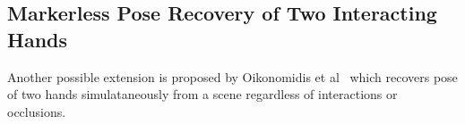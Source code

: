 \documentclass[a4paper]{article}
\begin{document}
    \subsection*{Markerless Pose Recovery of Two Interacting Hands}
      Another possible extension is proposed by Oikonomidis et al~\cite{otherhand} which recovers pose of two hands simulataneously from a scene regardless of interactions or occlusions.

  
  
\end{document}
